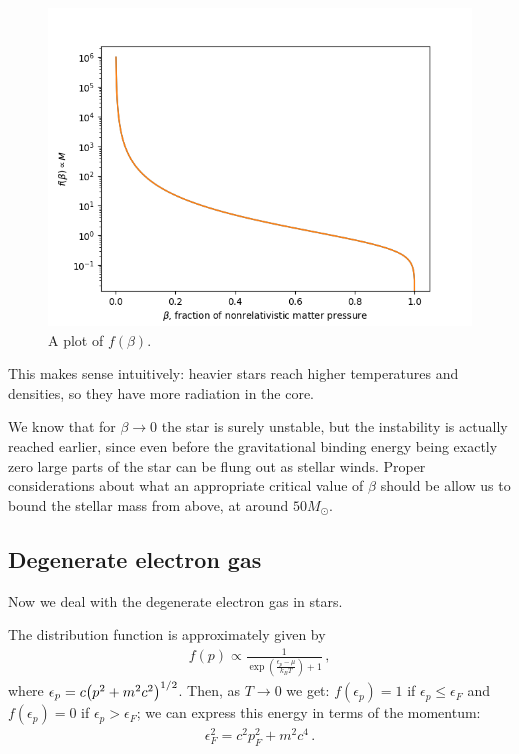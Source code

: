 \documentclass[main.tex]{subfiles}
\begin{document}
\begin{figure}[ht]
\centering
\includegraphics[width=\textwidth]{figures/beta_star_core_pressure.png}
\caption{A plot of \(f(\beta )\).}
\label{fig:beta-core-pressure}
\end{figure}

This makes sense intuitively: heavier stars reach higher temperatures and densities, so they have more radiation in the core. 

We know that for \(\beta \to 0\) the star is surely unstable, but the instability is actually reached earlier, since even before the gravitational binding energy being exactly zero large parts of the star can be flung out as stellar winds.
Proper considerations about what an appropriate critical value of \(\beta \) should be allow us to bound the stellar mass from above, at around \(50 M_{\odot}\). 


\subsection{Degenerate electron gas}

Now we deal with the degenerate electron gas in stars. 

The distribution function is approximately given by 
%
\begin{align}
  f(p) \propto \frac{1}{\exp(\frac{\epsilon _p - \mu }{k_B T})+1}
\,,
\end{align}
%
where \(\epsilon _p = c\qty(p^2+m^2c^2)^{1/2}\). 
Then, as \(T \rightarrow 0\) we get: \(f(\epsilon _p) = 1\) if \(\epsilon _p \leq \epsilon _F\) and \(f(\epsilon _p) = 0 \) if \(\epsilon _p > \epsilon _F\); we can express this energy in terms of the momentum: 
%
\begin{align}
  \epsilon_F^2 = c^2p_F^2 + m^2 c^{4}
\,.
\end{align}
\end{document}
